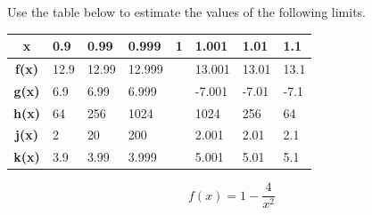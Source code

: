 \documentclass{siproblemset}
\begin{document}
    \begin{multipartquestion}{Use the table below to estimate the values of the following limits.}
    
        \begin{center}   
            \begin{tabular}{|c|C{1.2cm}|C{1.2cm}|C{1.2cm}|C{1.2cm}|C{1.2cm}|C{1.2cm}|C{1.2cm}|}
                \hline
                 \textbf{x}   & \textbf{0.9} & \textbf{0.99} & \textbf{0.999} & \textbf{1} & \textbf{1.001} & \textbf{1.01} & \textbf{1.1} \\ \hline
                \textbf{f(x)} &     12.9     &     12.99     &     12.999     &            &     13.001     &     13.01     &     13.1     \\ \hline
                \textbf{g(x)} &     6.9      &     6.99      &     6.999      &            &     -7.001     &     -7.01     &     -7.1     \\ \hline
                \textbf{h(x)} &      64      &      256      &      1024      &            &      1024      &      256      &      64      \\ \hline
                \textbf{j(x)} &      2       &      20       &      200       &            &     2.001      &     2.01      &     2.1      \\ \hline
                \textbf{k(x)} &     3.9      &     3.99      &     3.999      &            &     5.001      &     5.01      &     5.1      \\ \hline
            \end{tabular} 
        \end{center}
        \vspace{0.2cm}
    
        \begin{multicols}{5}
        \end{multicols}
    \end{multipartquestion}
    \tinysp


    \Normalsp
    
    $$f(x)=1-\dfrac{4}{x^2}$$

    \newpage
    
\end{document}
